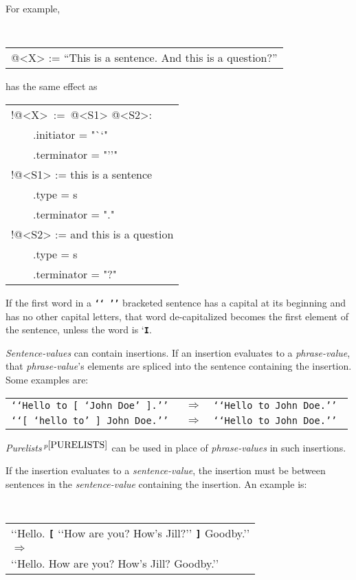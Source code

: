 \documentclass[12pt]{article}
\newcommand{\TT}[1]{{\tt \bfseries #1}}
\newcommand{\pagnote}[1]{$\,^{p\pageref{#1}}$}
\newenvironment{indpar}[1][0.3in]%
	{\begin{list}{}%
		     {\setlength{\itemsep}{0in}%
		      \setlength{\topsep}{0in}%
		      \setlength{\parsep}{1ex}%
		      \setlength{\labelwidth}{#1}%
		      \setlength{\leftmargin}{#1}%
		      \addtolength{\leftmargin}{\labelsep}}%
	 \item}%
	{\end{list}}
\begin{document}
For example,
\begin{indpar}
\tt
\begin{tabular}{l}
@<X> := ``This is a sentence.  And this is a question?''
\end{tabular}
\end{indpar}
{\rm has the same effect as}
\begin{indpar}
\begin{tabular}{l}
!@<X>~:=~@<S1> @<S2>: \\
~~~~.initiator = "`{}`" \\
~~~~.terminator = "'{}'" \\
!@<S1> := this is a sentence \\
~~~~.type = s \\
~~~~.terminator = "." \\
!@<S2> := and this is a question \\
~~~~.type = s \\
~~~~.terminator = "?" \\
\end{tabular}
\end{indpar}

If the first word in a \TT{`{}`~'{}'} bracketed sentence has a capital
at its beginning and has no other capital letters, that word de-capitalized
becomes the first element of the sentence, unless the word is `\TT{I}.

{\em Sentence-values} can contain insertions.
If an insertion evaluates to a {\em phrase-value}, that {\em phrase-value}'s
elements are spliced into the sentence containing the insertion.
Some examples are:
\begin{indpar}
\begin{tabular}{rcl}
\tt `{}`Hello to \TT{[} `John Doe' \TT{]}.'{}' & $\Longrightarrow$
                                           & \tt `{}`Hello to John Doe.'{}' \\
\tt `{}`\TT{[} `hello to' \TT{]} John Doe.'{}' & $\Longrightarrow$
                                           & \tt `{}`Hello to John Doe.'{}' \\
\end{tabular}
\end{indpar}
{\em Purelists}\pagnote{PURELISTS}
can be used in place of {\em phrase-values} in such insertions.

If the insertion evaluates to a {\em sentence-value}, the insertion must
be between sentences in the {\em sentence-value} containing the insertion.
An example is:
\begin{indpar}
\tt
\begin{tabular}{l}
`{}`Hello. \TT{[} `{}`How are you?  How's Jill?'{}' \TT{]} Goodby.'{}' \\
$\Longrightarrow$ \\
`{}`Hello. How are you?  How's Jill?  Goodby.'{}' \\
\end{tabular}
\end{indpar}
\end{document}
